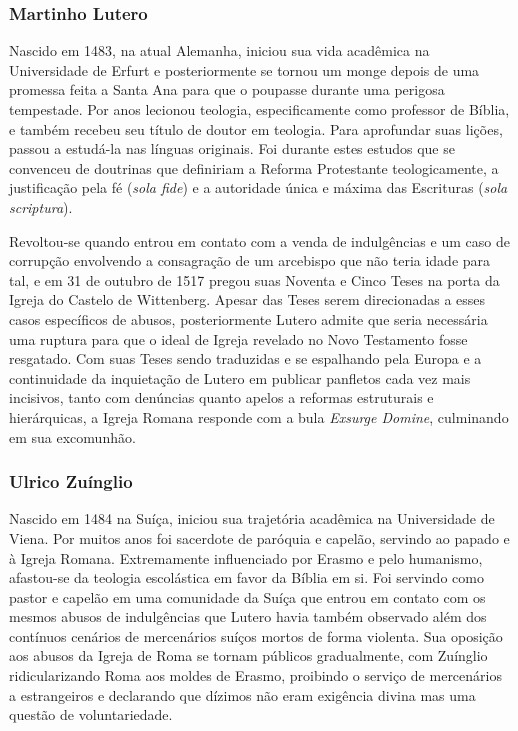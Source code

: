 \documentclass[
    article,            %
	12pt,				%
	oneside,			%
	a4paper,			%
	chapter=TITLE,		%
	section=TITLE,		%
	english,			%
	french,				%
	spanish,			%
	brazil				%
	]{abntex2}
\begin{document}
\subsubsection{Martinho Lutero}
Nascido em 1483, na atual Alemanha, iniciou sua vida acadêmica na Universidade de Erfurt e posteriormente se tornou um monge depois de uma promessa feita a Santa Ana para que o poupasse durante uma perigosa tempestade. Por anos lecionou teologia, especificamente como professor de Bíblia, e também recebeu seu título de doutor em teologia. Para aprofundar suas lições, passou a estudá-la nas línguas originais. Foi durante estes estudos que se convenceu de doutrinas que definiriam a Reforma Protestante teologicamente, a justificação pela fé (\emph{sola fide}) e a autoridade única e máxima das Escrituras (\emph{sola scriptura}).

Revoltou-se quando entrou em contato com a venda de indulgências e um caso de corrupção envolvendo a consagração de um arcebispo que não teria idade para tal, e em 31 de outubro de 1517 pregou suas Noventa e Cinco Teses na porta da Igreja do Castelo de Wittenberg. Apesar das Teses serem direcionadas a esses casos específicos de abusos, posteriormente Lutero admite que seria necessária uma ruptura para que o ideal de Igreja revelado no Novo Testamento fosse resgatado. Com suas Teses sendo traduzidas e se espalhando pela Europa e a continuidade da inquietação de Lutero em publicar panfletos cada vez mais incisivos, tanto com denúncias quanto apelos a reformas estruturais e hierárquicas, a Igreja Romana responde com a bula \emph{Exsurge Domine}, culminando em sua excomunhão.

\subsubsection{Ulrico Zuínglio}
Nascido em 1484 na Suíça, iniciou sua trajetória acadêmica na Universidade de Viena. Por muitos anos foi sacerdote de paróquia e capelão, servindo ao papado e à Igreja Romana. Extremamente influenciado por Erasmo e pelo humanismo, afastou-se da teologia escolástica em favor da Bíblia em si. Foi servindo como pastor e capelão em uma comunidade da Suíça que entrou em contato com os mesmos abusos de indulgências que Lutero havia também observado além dos contínuos cenários de mercenários suíços mortos de forma violenta. Sua oposição aos abusos da Igreja de Roma se tornam públicos gradualmente, com Zuínglio ridicularizando Roma aos moldes de Erasmo, proibindo o serviço de mercenários a estrangeiros e declarando que dízimos não eram exigência divina mas uma questão de voluntariedade.
\end{document}
